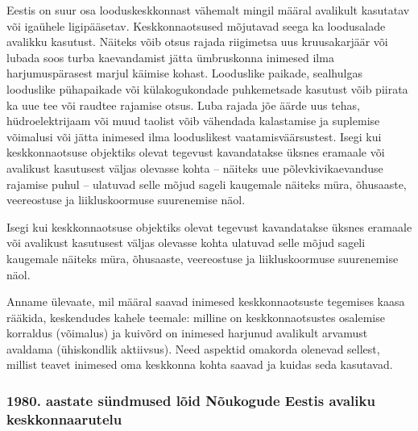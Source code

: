 \documentclass[estonian,]{article}
\begin{document}
Eestis on suur osa looduskeskkonnast vähemalt mingil määral avalikult kasutatav või igaühele ligipääsetav. Keskkonnaotsused mõjutavad seega ka loodusalade avalikku kasutust. Näiteks võib otsus rajada riigimetsa uus kruusakarjäär või lubada soos turba kaevandamist jätta ümbruskonna inimesed ilma harjumuspärasest marjul käimise kohast. Looduslike paikade, sealhulgas looduslike pühapaikade või külakogukondade puhkemetsade kasutust võib piirata ka uue tee või raudtee rajamise otsus. Luba rajada jõe äärde uus tehas, hüdroelektrijaam või muud taolist võib vähendada kalastamise ja suplemise võimalusi või jätta inimesed ilma looduslikest vaatamisväärsustest. Isegi kui keskkonnaotsuse objektiks olevat tegevust kavandatakse üksnes eramaale või avalikust kasutusest väljas olevasse kohta -- näiteks uue põlevkivikaevanduse rajamise puhul -- ulatuvad selle mõjud sageli kaugemale näiteks müra, õhusaaste, veereostuse ja liikluskoormuse suurenemise näol.

\begin{blockquote-right}
Isegi kui keskkonnaotsuse objektiks olevat tegevust kavandatakse üksnes
eramaale või avalikust kasutusest väljas olevasse kohta ulatuvad selle
mõjud sageli kaugemale näiteks müra, õhusaaste, veereostuse ja
liikluskoormuse suurenemise näol.
\end{blockquote-right}

Anname ülevaate, mil määral saavad inimesed keskkonnaotsuste tegemises kaasa rääkida, keskendudes kahele teemale: milline on keskkonnaotsustes osalemise korraldus (võimalus) ja kuivõrd on inimesed harjunud avalikult arvamust avaldama (ühiskondlik aktiivsus). Need aspektid omakorda olenevad sellest, millist teavet inimesed oma keskkonna kohta saavad ja kuidas seda kasutavad.

\hypertarget{aastate-suxfcndmused-luxf5id-nuxf5ukogude-eestis-avaliku-keskkonnaarutelu}{%
\subsubsection*{1980. aastate sündmused lõid Nõukogude Eestis avaliku keskkonnaarutelu}\label{aastate-suxfcndmused-luxf5id-nuxf5ukogude-eestis-avaliku-keskkonnaarutelu}}
\end{document}
